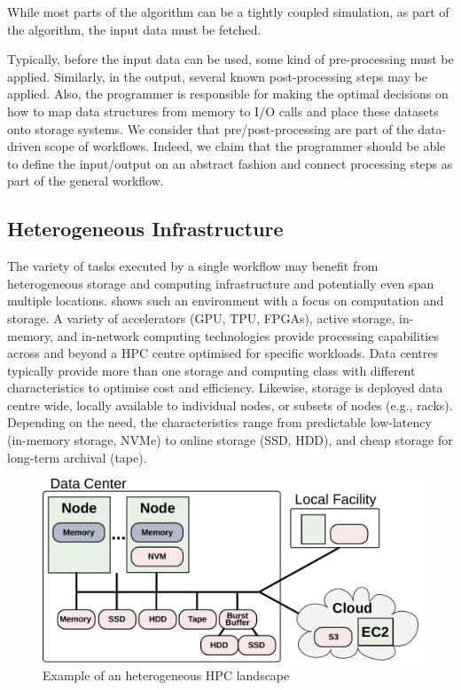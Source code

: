 \documentclass[a4paper]{article}
\begin{document}
{{While most parts of the algorithm can be a tightly coupled simulation, as part of the algorithm, the input data must be fetched.

Typically, before the input data can be used, some kind of pre-processing must be applied. Similarly, in the output, several known post-processing steps may be applied.
Also, the programmer is responsible for making the optimal decisions on how to map data structures from memory to I/O calls and place these datasets onto storage systems.
We consider that pre/post-processing are part of the data-driven scope of workflows.
Indeed, we claim that the programmer should be able to define the input/output on an abstract fashion and connect processing steps as part of the general workflow.

\subsection{Heterogeneous Infrastructure}

The variety of tasks executed by a single workflow may benefit from heterogeneous storage and computing infrastructure and potentially even span multiple locations.
 shows such an environment with a focus on computation and storage.
A variety of accelerators (GPU, TPU, FPGAs), active storage, in-memory, and in-network computing technologies provide processing capabilities across and beyond a HPC centre optimised for specific workloads.
Data centres typically provide more than one storage and computing class with different characteristics to optimise cost and efficiency.
Likewise, storage is deployed data centre wide, locally available to individual nodes, or subsets of nodes (e.g., racks). Depending on the need, the characteristics range from predictable low-latency (in-memory storage, NVMe) to online storage (SSD, HDD), and cheap storage for long-term archival (tape).

\begin{figure}[H]
  \centering
  \includegraphics[width=0.6\columnwidth]{system}
  \caption{Example of an heterogeneous HPC landscape}
  \label{fig:heterogeneous}
\end{figure}

}}
\end{document}
